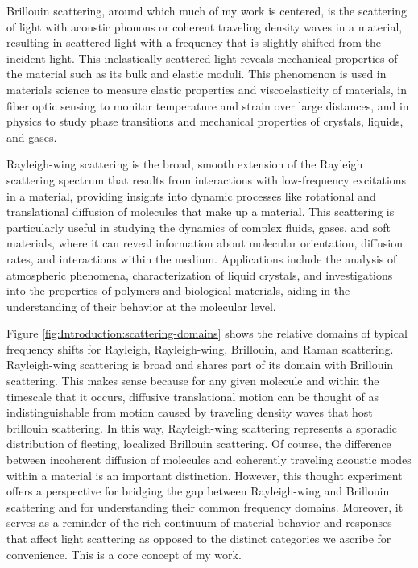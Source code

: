 Brillouin scattering, around which much of my work is centered, is the scattering of light with acoustic phonons or coherent traveling density waves in a material, resulting in scattered light with a frequency that is slightly shifted from the incident light. This inelastically scattered light reveals mechanical properties of the material such as its bulk and elastic moduli. This phenomenon is used in materials science to measure elastic properties and viscoelasticity of materials\cite{}, in fiber optic sensing to monitor temperature and strain over large distances\cite{}, and in physics to study phase transitions and mechanical properties of crystals, liquids, and gases\cite{}.

Rayleigh-wing scattering is the broad, smooth extension of the Rayleigh scattering spectrum that results from interactions with low-frequency excitations in a material, providing insights into dynamic processes like rotational and translational diffusion of molecules that make up a material. This scattering is particularly useful in studying the dynamics of complex fluids, gases, and soft materials, where it can reveal information about molecular orientation, diffusion rates, and interactions within the medium. Applications include the analysis of atmospheric phenomena\cite{}, characterization of liquid crystals\cite{}, and investigations into the properties of polymers and biological materials\cite{}, aiding in the understanding of their behavior at the molecular level.

Figure \ref{fig:Introduction:scattering-domains} shows the relative domains of typical frequency shifts for Rayleigh, Rayleigh-wing, Brillouin, and Raman scattering. Rayleigh-wing scattering is broad and shares part of its domain with Brillouin scattering. This makes sense because for any given molecule and within the timescale that it occurs, diffusive translational motion can be thought of as indistinguishable from motion caused by traveling density waves that host brillouin scattering. In this way, Rayleigh-wing scattering represents a sporadic distribution of fleeting, localized Brillouin scattering. Of course, the difference between incoherent diffusion of molecules and coherently traveling acoustic modes within a material is an important distinction. However, this thought experiment offers a perspective for bridging the gap between Rayleigh-wing and Brillouin scattering and for understanding their common frequency domains. Moreover, it serves as a reminder of the rich continuum of material behavior and responses that affect light scattering as opposed to the distinct categories we ascribe for convenience. This is a core concept of my work.

